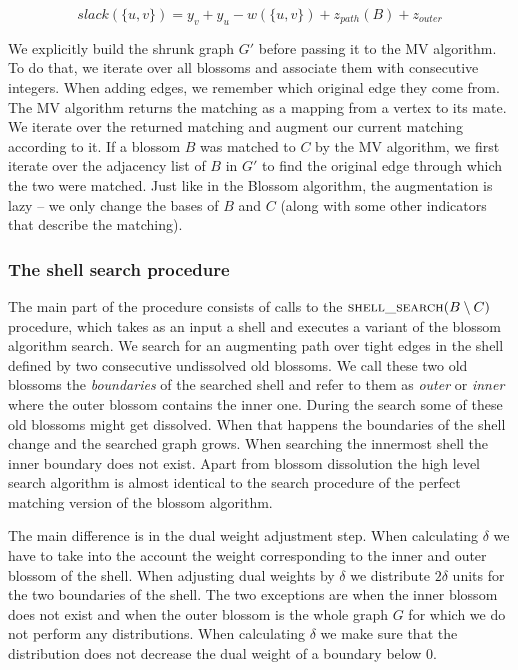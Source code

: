 \[ slack(\{u, v\}) = y_v + y_u - w(\{u, v\}) + z_{path}(B) + z_{outer} \]

We explicitly build the shrunk graph $G'$ before passing it to the MV algorithm. To do that, we iterate over all blossoms and associate them with consecutive integers. When adding edges, we remember which original edge they come from. The MV algorithm returns the matching as a mapping from a vertex to its mate. We iterate over the returned matching and augment our current matching according to it. If a blossom $B$ was matched to $C$ by the MV algorithm, we first iterate over the adjacency list of $B$ in $G'$ to find the original edge through which the two were matched. Just like in the Blossom algorithm, the augmentation is lazy – we only change the bases of $B$ and $C$ (along with some other indicators that describe the matching).

\subsubsection{The shell search procedure}

The main part of the procedure consists of calls to the $\textsc{shell\_search}(B \setminus C)$ procedure, which takes as an input a shell and executes a variant of the blossom algorithm search. We search for an augmenting path over tight edges in the shell defined by two consecutive undissolved old blossoms. We call these two old blossoms the \textit{boundaries} of the searched shell and refer to them as \textit{outer} or \textit{inner} where the outer blossom contains the inner one. During the search some of these old blossoms might get dissolved. When that happens the boundaries of the shell change and the searched graph grows. When searching the innermost shell the inner boundary does not exist. Apart from blossom dissolution the high level search algorithm is almost identical to the search procedure of the perfect matching version of the blossom algorithm.

The main difference is in the dual weight adjustment step. When calculating $\delta$ we have to take into the account the weight corresponding to the inner and outer blossom of the shell. When adjusting dual weights by $\delta$ we distribute $2\delta$ units for the two boundaries of the shell. The two exceptions are when the inner blossom does not exist and when the outer blossom is the whole graph $G$ for which we do not perform any distributions. When calculating $\delta$ we make sure that the distribution does not decrease the dual weight of a boundary below $0$.


